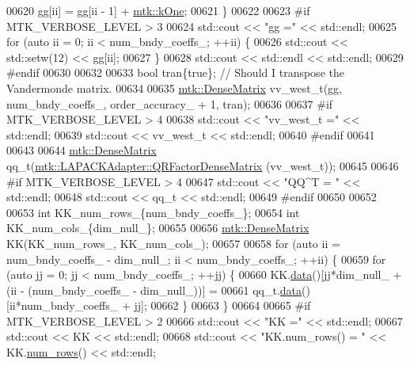 \begin{DoxyCode}
{{00620     gg[ii] = gg[ii - 1] + \hyperlink{group__c01-roots_ga26407c24d43b6b95480943340d285c71}{mtk::kOne};
00621   \}
00622 
00623 \textcolor{preprocessor}{  #if MTK\_VERBOSE\_LEVEL > 3}
00624   std::cout << \textcolor{stringliteral}{"gg ="} << std::endl;
00625   \textcolor{keywordflow}{for} (\textcolor{keyword}{auto} ii = 0; ii < num\_bndy\_coeffs\_; ++ii) \{
00626     std::cout << std::setw(12) << gg[ii];
00627   \}
00628   std::cout << std::endl << std::endl;
00629 \textcolor{preprocessor}{  #endif}
00630 
00632 
00633   \textcolor{keywordtype}{bool} tran\{\textcolor{keyword}{true}\}; \textcolor{comment}{// Should I transpose the Vandermonde matrix.}
00634 
00635   \hyperlink{classmtk_1_1DenseMatrix}{mtk::DenseMatrix} vv\_west\_t(gg, num\_bndy\_coeffs\_, order\_accuracy\_ + 1, tran);
00636 
00637 \textcolor{preprocessor}{  #if MTK\_VERBOSE\_LEVEL > 4}
00638   std::cout << \textcolor{stringliteral}{"vv\_west\_t ="} << std::endl;
00639   std::cout << vv\_west\_t << std::endl;
00640 \textcolor{preprocessor}{  #endif}
00641 
00643 
00644   \hyperlink{classmtk_1_1DenseMatrix}{mtk::DenseMatrix} qq\_t(\hyperlink{classmtk_1_1LAPACKAdapter_ae5c6e78c9c819c9ac7a6f31bfd011d7a}{mtk::LAPACKAdapter::QRFactorDenseMatrix}
      (vv\_west\_t));
00645 
00646 \textcolor{preprocessor}{  #if MTK\_VERBOSE\_LEVEL > 4}
00647   std::cout << \textcolor{stringliteral}{"QQ^T = "} << std::endl;
00648   std::cout << qq\_t << std::endl;
00649 \textcolor{preprocessor}{  #endif}
00650 
00652 
00653   \textcolor{keywordtype}{int} KK\_num\_rows\_\{num\_bndy\_coeffs\_\};
00654   \textcolor{keywordtype}{int} KK\_num\_cols\_\{dim\_null\_\};
00655 
00656   \hyperlink{classmtk_1_1DenseMatrix}{mtk::DenseMatrix} KK(KK\_num\_rows\_, KK\_num\_cols\_);
00657 
00658   \textcolor{keywordflow}{for} (\textcolor{keyword}{auto} ii = num\_bndy\_coeffs\_ - dim\_null\_; ii < num\_bndy\_coeffs\_; ++ii) \{
00659     \textcolor{keywordflow}{for} (\textcolor{keyword}{auto} jj = 0; jj < num\_bndy\_coeffs\_; ++jj) \{
00660       KK.\hyperlink{classmtk_1_1DenseMatrix_a0c33b8a9e01d157c61ddbdf807c25d84}{data}()[jj*dim\_null\_ + (ii - (num\_bndy\_coeffs\_ - dim\_null\_))] =
00661           qq\_t.\hyperlink{classmtk_1_1DenseMatrix_a0c33b8a9e01d157c61ddbdf807c25d84}{data}()[ii*num\_bndy\_coeffs\_ + jj];
00662     \}
00663   \}
00664 
00665 \textcolor{preprocessor}{  #if MTK\_VERBOSE\_LEVEL > 2}
00666   std::cout << \textcolor{stringliteral}{"KK ="} << std::endl;
00667   std::cout << KK << std::endl;
00668   std::cout << \textcolor{stringliteral}{"KK.num\_rows() = "} << KK.\hyperlink{classmtk_1_1DenseMatrix_a53f3afb3b6a8d21854458aaa9663cc74}{num\_rows}() << std::endl;
}}
\end{DoxyCode}
